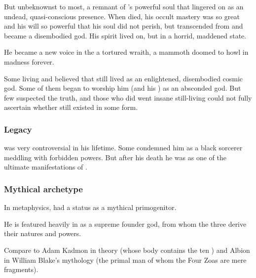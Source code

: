 But unbeknownst to most, a remnant of \Sethicus's powerful soul that lingered on as an undead, quasi-conscious presence.
When \Sethicus died, his occult mastery was so great and his will so powerful that his soul did not perish, but transcended from \Miith and became a disembodied god.
His spirit lived on, but in a horrid, maddened state. 

He became a new voice in the \dash a tortured wraith, a mammoth \daemon doomed to howl in madness forever. 


Some living \dragons and \ophidians believed that \Sethicus still lived as an enlightened, disembodied cosmic god.
Some of them began to worship him (and his ) as an absconded god.
But few suspected the truth, and those who did went insane still-living could not fully ascertain whether \Sethicus still existed in some form.






\subsubsection{Legacy}
\Sethicus was very controversial in his lifetime. Some condemned him as a black sorcerer meddling with forbidden \xzaishannic powers. But after his death he was  as one of the ultimate manifestations of . 






\subsubsection{Mythical archetype}
In \draconian metaphysics, \Sethicus had a status as a mythical primogenitor. 

He is featured heavily in \WanderersInDarknessEmph as a supreme founder god, from whom the three  derive their natures and powers. 

Compare to Adam Kadmon in \Cabbalist theory (whose body contains the ten \sephiroth) and Albion in William Blake's mythology (the primal man of whom the Four Zoas are mere fragments). 











